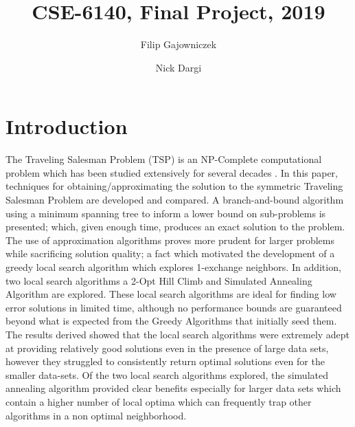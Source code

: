 \documentclass[format=sigconf]{acmart}
\begin{document}
\title{CSE-6140, Final Project, 2019}
\author{Filip Gajowniczek}
\author{Nick Dargi}


\section{Introduction}
The Traveling Salesman Problem (TSP) is an NP-Complete computational problem which has been studied extensively for several decades \cite{laporte_1992}. In this paper, techniques for obtaining/approximating the solution to the symmetric Traveling Salesman Problem are developed and compared. 
A branch-and-bound algorithm using a minimum spanning tree to inform a lower bound on sub-problems is presented; which, given enough time, produces an exact solution to the problem. The use of approximation algorithms proves more prudent for larger problems while sacrificing solution quality; a fact which motivated the development of a greedy local search algorithm which explores 1-exchange neighbors. 
In addition, two local search algorithms a 2-Opt Hill Climb and Simulated Annealing Algorithm are explored. 
These local search algorithms are ideal for finding low error solutions in limited time, although no performance bounds are guaranteed beyond 
what is expected from the Greedy Algorithms that initially seed them. The results derived showed that the local search algorithms were 
extremely adept at providing relatively good solutions even in the presence of large data sets, however they struggled to consistently return optimal solutions even for the smaller 
data-sets. Of the two local search algorithms explored, the simulated annealing algorithm provided clear benefits especially for larger data sets which contain a higher number of local optima which can frequently trap
 other algorithms in a non optimal neighborhood.
\end{document}
